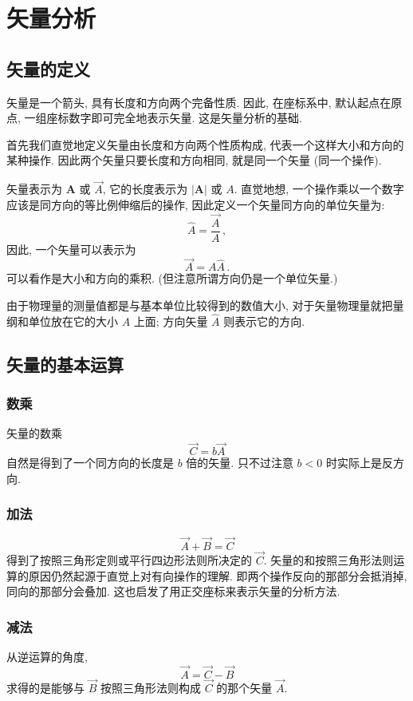 \documentclass{book}
\newcommand{\abs}[1]{\left\lvert #1 \right\rvert}
\numberwithin{equation}{section}
\numberwithin{figure}{section}
\theoremstyle{definition}
\begin{document}
\section{矢量分析}
\subsection{矢量的定义}
矢量是一个箭头,
具有长度和方向两个完备性质.
因此, 在座标系中, 默认起点在原点, 一组座标数字即可完全地表示矢量. 这是矢量分析的基础.

首先我们直觉地定义矢量由长度和方向两个性质构成, 代表一个这样大小和方向的某种操作. 因此两个矢量只要长度和方向相同, 就是同一个矢量 (同一个操作).

矢量表示为 $\mathbf{A}$ 或 $\vec{A}$, 它的长度表示为 $\abs{\mathbf{A}}$ 或 $A$. 直觉地想, 一个操作乘以一个数字应该是同方向的等比例伸缩后的操作, 因此定义一个矢量同方向的单位矢量为:
\begin{equation*}
  \hat{A}=\frac{\vec{A}}{A}\,,
\end{equation*}
因此, 一个矢量可以表示为
\begin{equation*}
  \vec{A}=A\hat{A}\,.
\end{equation*}
可以看作是大小和方向的乘积. (但注意所谓方向仍是一个单位矢量.)

由于物理量的测量值都是与基本单位比较得到的数值大小, 对于矢量物理量就把量纲和单位放在它的大小 $A$ 上面; 方向矢量 $\hat{A}$ 则表示它的方向.
\subsection{矢量的基本运算}
\subsubsection{数乘}
矢量的数乘
\begin{equation*}
  \vec{C}=b\vec{A}
\end{equation*}
自然是得到了一个同方向的长度是 $b$ 倍的矢量. 只不过注意 $b<0$ 时实际上是反方向.
\subsubsection{加法}
\begin{equation*}
  \vec{A}+\vec{B}=\vec{C}
\end{equation*}
得到了按照三角形定则或平行四边形法则所决定的 $\vec{C}$.
矢量的和按照三角形法则运算的原因仍然起源于直觉上对有向操作的理解. 即两个操作反向的那部分会抵消掉, 同向的那部分会叠加. 这也启发了用正交座标来表示矢量的分析方法.
\subsubsection{减法}
从逆运算的角度,
\begin{equation*}
  \vec{A}=\vec{C}-\vec{B}
\end{equation*}
求得的是能够与 $\vec{B}$ 按照三角形法则构成 $\vec{C}$ 的那个矢量 $\vec{A}$.
\end{document}

